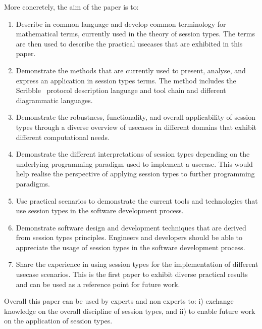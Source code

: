 More concretely, the aim of the paper is to:
%
\begin{enumerate}
	\item	Describe in common language and develop common terminology
			for mathematical terms, currently used in the theory of
			session types.
			The terms are then used to describe the practical usecases
			that are exhibited in this paper.

	\item	Demonstrate the methods that are currently used to present,
			analyse, and express an application in session types terms.
			The method includes the Scribble~\cite{scribble}
			protocol description language and tool chain and different
			diagrammatic languages.

	\item	Demonstrate the robustness, functionality, and overall applicability
			of session types through a diverse overview of usecases in
			different domains that exhibit different computational needs.

	\item	Demonstrate the different interpretations of
			session types depending on the underlying programming paradigm
			used to implement a usecase.
			This would help realise the perspective of applying session types to
			further programming paradigms.


	\item	Use practical scenarios to demonstrate the current tools and
			technologies that use session types in the software development
			process.

	\item	Demonstrate software design and development techniques that
			are derived from session types principles. Engineers and
			developers should be able to appreciate the usage of session types
			in the software development process.
		
	\item	Share the experience in using session types for the
			implementation of different usecase scenarios. This
			is the first paper to exhibit diverse practical results
			and can be used as a reference point for future work.
\end{enumerate}

Overall this paper can be used by experts and non experts
to: i) exchange knowledge on the overall discipline of session types,
and ii) to enable future work on the application of session types.



